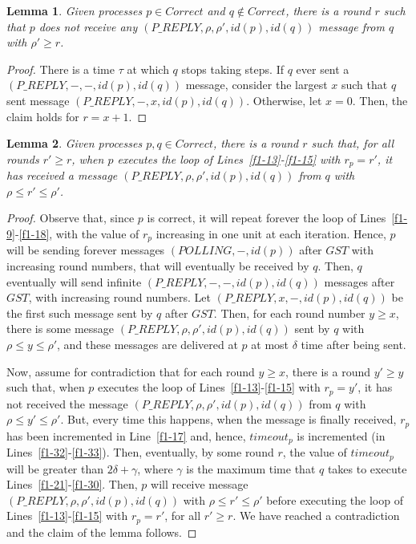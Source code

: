 \documentclass[10pt, conference, compsocconf]{IEEEtran}
\newtheorem{lemma}{Lemma}
\newcommand{\C}{{\mathit{Correct}}}
\begin{document}
\begin{lemma}
\label{l-faulty}
Given processes $p \in \C$ and $q \notin \C$, there is a round $r$ 
such that $p$ does not receive any 
$(\mathit{P\_REPLY}, \rho, \rho', id(p) , id(q))$ message from 
$q$ with $\rho' \ge r$.
\end{lemma}
\begin{proof}
There is a time $\tau$ at which $q$ stops taking steps. If $q$ ever 
sent a $(\mathit{P\_REPLY}, -, - , id(p) , id(q))$ message, 
consider the largest $x$
such that $q$ sent message $(\mathit{P\_REPLY}, -, x, id(p) , id(q))$. 
Otherwise, let $x=0$. Then, the claim holds for $r=x+1$.
\end{proof}

\begin{lemma}
\label{l-correct}
Given processes $p,q \in \C$, there is a round $r$ such that, for all 
rounds $r' \geq r$, 
when $p$ executes the loop of Lines~\ref{f1-13}-\ref{f1-15} 
with $r_p = r'$, it has received 
a message 
$(\mathit{P\_REPLY}, \rho, \rho', id(p) , id(q))$ from $q$ with 
$\rho \le r' \le \rho'$.
\end{lemma}
\begin{proof}
Observe that, since $p$ is correct, it will repeat forever the loop of 
Lines~\ref{f1-9}-\ref{f1-18}, with the value of $r_p$ 
increasing in one unit at each iteration.
Hence, $p$ will be sending forever messages $(\mathit{POLLING}, -, id(p))$ 
after $GST$ with increasing round numbers, that will eventually
 be received by $q$. Then, $q$ eventually will send infinite 
$(\mathit{P\_REPLY}, -, - , id(p) , id(q))$ messages after $GST$, 
with increasing round numbers. 
Let $(\mathit{P\_REPLY}, x, - , id(p) , id(q))$ be the first such 
message sent by $q$ after $GST$. Then, for each round number $y \ge x$, 
there is some message $(\mathit{P\_REPLY}, \rho, \rho', id(p) , id(q))$ 
sent by $q$ with $\rho \le y \le \rho'$, and these messages are delivered at
 $p$ at most $\delta$ time after being sent. 


Now, assume for contradiction that for each round $y \geq x$, 
there is a round $y' \geq y$ such that, when $p$ executes the loop 
of Lines~\ref{f1-13}-\ref{f1-15} with $r_p = y'$, 
it has not received the message 
$(\mathit{P\_REPLY}, \rho, \rho', id(p) , id(q))$ from $q$ with 
$\rho \le y' \le \rho'$. But, every time this happens, when the message 
is finally received,
$r_p$ has been incremented in Line~\ref{f1-17} and, hence, 
$\mathit{timeout}_p$ 
is incremented (in Lines~\ref{f1-32}-\ref{f1-33}). 
Then, eventually, by some round $r$, 
the value of $\mathit{timeout}_p$ will be greater than $2 \delta + \gamma$, 
where $\gamma$ is the maximum time that $q$ takes 
to execute Lines~\ref{f1-21}-\ref{f1-30}. 
Then, $p$ will receive 
message $(\mathit{P\_REPLY}, \rho, \rho', id(p) , id(q))$ 
with $\rho \le r' \le \rho'$ before executing the loop of 
Lines~\ref{f1-13}-\ref{f1-15} 
with $r_p = r'$, for all $r' \geq r$. We have reached a contradiction 
and the claim of the lemma follows.
\end{proof}
\end{document}
